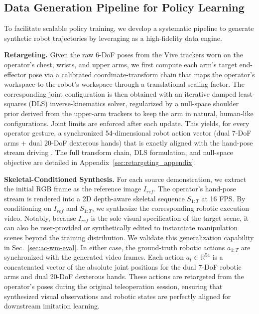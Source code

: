 \subsection{Data Generation Pipeline for Policy Learning}
\label{sec:data_pipeline}

To facilitate scalable policy training, we develop a systematic pipeline to generate synthetic robot trajectories by leveraging \our as a high-fidelity data engine. 

\noindent 
\textbf{Retargeting.}
Given the raw 6-DoF poses from the Vive trackers worn on the operator's chest, wrists, and upper arms, we first compute each arm's target end-effector pose via a calibrated coordinate-transform chain that maps the operator's workspace to the robot's workspace through a translational scaling factor. The corresponding joint configuration is then obtained with an iterative damped least-squares (DLS) inverse-kinematics solver, regularized by a null-space shoulder prior derived from the upper-arm trackers to keep the arm in natural, human-like configurations. Joint limits are enforced after each update. This yields, for every operator gesture, a synchronized 54-dimensional robot action vector (dual 7-DoF arms + dual 20-DoF dexterous hands) that is exactly aligned with the hand-pose stream driving \our. The full transform chain, DLS formulation, and null-space objective are detailed in Appendix~\ref{sec:retargeting_appendix}.


\noindent 
\textbf{Skeletal-Conditioned Synthesis.} For each source demonstration, we extract the initial RGB frame as the reference image $I_{ref}$. The operator's hand-pose stream is rendered into a 2D depth-aware skeletal sequence $S_{1:T}$ at 16 FPS. By conditioning \our on $I_{ref}$ and $S_{1:T}$, we synthesize the corresponding robotic execution video. 
Notably, because $I_{ref}$ is the sole visual specification of the target scene, it can also be user-provided or synthetically edited to instantiate manipulation scenes beyond the training distribution. We validate this generalization capability in Sec.~\ref{sec:ac-wm-eval}.
In either case, the ground-truth robotic actions $a_{1:T}$ are synchronized with the generated video frames. Each action $a_t \in \mathbb{R}^{54}$ is a concatenated vector of the absolute joint positions for the dual 7-DoF robotic arms and dual 20-DoF dexterous hands. These actions are retargeted from the operator's poses during the original teleoperation session, ensuring that synthesized visual observations and robotic states are perfectly aligned for downstream imitation learning.

